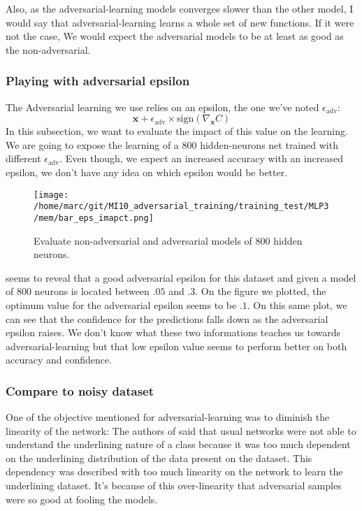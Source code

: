 			Also, as the adversarial-learning models converges slower than the other model, I would say that adversarial-learning learns a whole set of new functions. If it were not the case, We would expect the adversarial models to be at least as good as the non-adversarial.



		\subsubsection{Playing with adversarial epsilon}
		\label{ssub:playing_with_adversarial_epsilon}
			The Adversarial learning we use relies on an epsilon, the one we've noted $\epsilon_{\text{adv}}$:
			$$ \boldsymbol{x} + \epsilon_{\text{adv}} \times \text{sign}(\nabla_{\boldsymbol{x}} C) $$
			In this subsection, we want to evaluate the impact of this value on the learning. We are going to expose the learning of a 800 hidden-neurons net trained with different $\epsilon_{\text{adv}}$. Even though, we expect an increased accuracy with an increased epsilon, we don't have any idea on which epsilon would be better. 

			\begin{figure}
				\centering
				\texttt{[image: /home/marc/git/MI10\_adversarial\_training/training\_test/MLP3/mem/bar\_eps\_imapct.png]}
				\caption{Evaluate non-adversarial and adversarial models of 800 hidden neurons.}
				\label{fig:mnist_adv_eps}
			\end{figure}
			
			 seems to reveal that a good adversarial epsilon for this dataset and given a model of 800 neurons is located between $.05$ and $.3$. On the figure we plotted, the optimum value for the adversarial epsilon seems to be $.1$. On this same plot, we can see that the confidence for the predictions falls down as the adversarial epsilon raises. We don't know what these two informations teaches us towards adversarial-learning but that low epsilon value seems to perform better on both accuracy and confidence.


		\subsubsection{Compare to noisy dataset} 
		\label{ssub:compare_to_noisy_dataset}
			One of the objective mentioned for adversarial-learning was to diminish the linearity of the network: The authors of \cite{goodfellow2014explaining} said that usual networks were not able to understand the underlining nature of a class because it was too much dependent on the underlining distribution of the data present on the dataset. This dependency was described with too much linearity on the network to learn the underlining dataset. It's because of this over-linearity that adversarial samples were so good at fooling the models.

